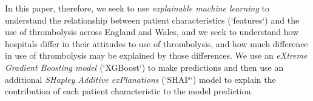 

In this paper, therefore, we seek to use \emph{explainable machine learning} to understand the relationship between patient characteristics (`features`) and the use of thrombolysis across England and Wales, and we seek to understand how hospitals differ in their attitudes to use of thrombolysis, and how much difference in use of thrombolysis may be explained by those differences. We use an \emph{eXtreme Gradient Boosting model \cite{chen_xgboost_2016}} (`XGBoost`) to make predictions and then use an additional \emph{SHapley Additive exPlanations} \cite{lundberg_unified_2017} (`SHAP`) model to explain the contribution of each patient characteristic to the model prediction.